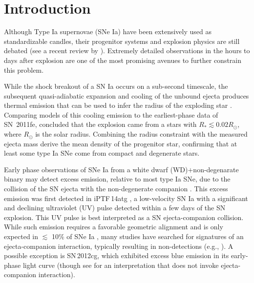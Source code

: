 \documentclass[twocolumn]{aastex61}
\newcommand{\sr}{R_\odot}
\newcommand{\ycao}[1]{{\color{red} ycao: {#1}}}
\begin{document}

\section{Introduction}
\label{sec:intro}

Although Type Ia supernovae (SNe Ia) have been extensively used as
standardizable candles, their progenitor systems and explosion
physics are still debated (see a recent review by
\citealt{2014ARA&A..52..107M}). Extremely detailed
observations in the hours to days after explosion are one of the most promising avenues to further
constrain this problem.

While the shock breakout of a SN Ia occurs on a sub-second timescale,
the subsequent quasi-adiabatic expansion and cooling of the unbound
ejecta produces thermal emission that can be used to infer the
radius of the exploding star
\citep{2010ApJ...708..598P,2011ApJ...728...63R}. Comparing models of
this cooling emission to the earliest-phase data of SN~2011fe,
\citet{2012ApJ...744L..17B} concluded that the explosion came from a 
stars with $R_\ast \lesssim 0.02\sr$, where $\sr$ is the solar
radius. Combining the radius constraint with the measured ejecta 
mass \citeauthor{2012ApJ...744L..17B} derive the mean density of the 
progenitor star, confirming that at least some type Ia SNe come from 
compact and degenerate stars. 

Early phase observations of SNe Ia from a white dwarf (WD)$+$non-degenarate binary
may detect excess emission, relative to most type Ia SNe, due to the 
collision of the SN ejecta with the non-degenerate companion 
\citep{1973ApJ...186.1007W,2010ApJ...708.1025K}. This excess 
emission was first detected in iPTF\,14atg  \citep{2015Natur.521..328C}, a low-velocity SN Ia with a significant and declining ultraviolet (UV) pulse detected within a
few days of the SN explosion. This UV pulse is best interpreted as a
SN ejecta-companion collision. While such emission requires a 
favorable geometric alignment and is only expected in $\lesssim$ 
10\% of SNe Ia \citep{2010ApJ...708.1025K}, many studies have 
searched for signatures of an ejecta-companion interaction, 
typically resulting in non-detections 
(e.g., \citealt{2010ApJ...722.1691H,2011ApJ...741...20B,2012ApJ...744...38F,
  2012ApJ...744L..17B,2015Natur.521..332O,
  2013ApJ...778L..15Z,2015ApJ...799..106G,2016ApJ...826..144S,
  2015ApJS..221...22I}). A possible exception is SN\,2012cg, 
which exhibited excess blue emission in its early-phase light curve 
\citet{2016ApJ...820...92M} (though see 
\citealt{2016arXiv161007601S} for an interpretation that does not 
invoke ejecta-companion interaction). 
\end{document}
